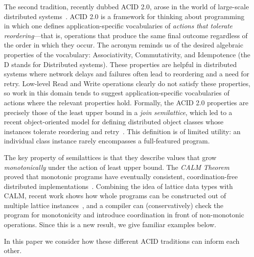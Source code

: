 \documentclass{sig-alternate}
\begin{document}
The second tradition, recently dubbed \textsf{ACID 2.0}, arose in the world of
large-scale distributed systems~\cite{Helland2009}.  ACID 2.0 is a framework for
thinking about programming in which one defines application-specific
vocabularies of \emph{actions that tolerate reordering}---that is, operations
that produce the same final outcome regardless of the order in which they occur.
The acronym reminds us of the desired algebraic properties of the vocabulary:
Associativity, Commutativity, and Idempotence (the D stands for Distributed
systems).  These properties are helpful in distributed systems where network
delays and failures often lead to reordering and a need for retry. Low-level
Read and Write operations clearly do not satisfy these properties, so work in
this domain tends to suggest application-specific vocabularies of actions where
the relevant properties hold.  Formally, the ACID 2.0 properties are precisely
those of the least upper bound in a \emph{join semilattice}, which led to a
recent object-oriented model for defining distributed object classes whose
instances tolerate reordering and retry~\cite{Shapiro2011a,Shapiro2011b}.  This
definition is of limited utility: an individual class instance rarely
encompasses a full-featured program.

The key property of semilattices is that they describe values that grow
\emph{monotonically} under the action of least upper bound.  The \emph{CALM
  Theorem} proved that monotonic programs have eventually consistent,
coordination-free distributed
implementations~\cite{Alvaro2011,Ameloot2011,Hellerstein2010}.  Combining the
idea of lattice data types with CALM, recent work shows how whole programs can
be constructed out of multiple lattice instances~\cite{Conway2012}, and a
compiler can (conservatively) check the program for monotonicity and introduce
coordination in front of non-monotonic operations.  Since this is a new result,
we give familiar examples below.

In this paper we consider how these different ACID traditions can inform each
other.
\end{document}
